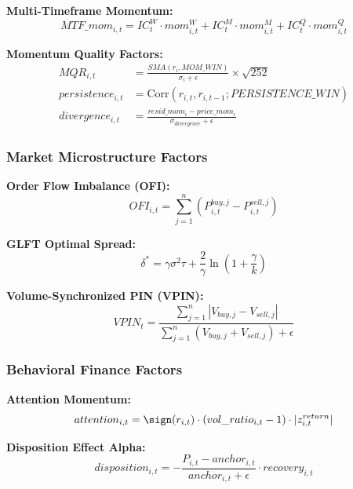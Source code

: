 \documentclass[11pt,letterpaper]{book}
\newcommand{\Corr}{\mathrm{Corr}}
\begin{document}
\textbf{Multi-Timeframe Momentum:}
\begin{equation}
MTF\_mom_{i,t} = IC_t^W \cdot mom_{i,t}^W + IC_t^M \cdot mom_{i,t}^M + IC_t^Q \cdot mom_{i,t}^Q
\end{equation}

\textbf{Momentum Quality Factors:}
\begin{align}
MQR_{i,t} &= \frac{SMA(r_i, MOM\_WIN)}{\sigma_i + \epsilon} \times \sqrt{252} \\
persistence_{i,t} &= \Corr(r_{i,t}, r_{i,t-1}; PERSISTENCE\_WIN) \\
divergence_{i,t} &= \frac{resid\_mom_i - price\_mom_i}{\sigma_{divergence} + \epsilon}
\end{align}

\subsubsection{Market Microstructure Factors}

\textbf{Order Flow Imbalance (OFI):}
\begin{equation}
OFI_{i,t} = \sum_{j=1}^n (P_{i,t}^{buy,j} - P_{i,t}^{sell,j})
\end{equation}

\textbf{GLFT Optimal Spread:}
\begin{equation}
\delta^* = \gamma \sigma^2 \tau + \frac{2}{\gamma} \ln\left(1 + \frac{\gamma}{k}\right)
\end{equation}

\textbf{Volume-Synchronized PIN (VPIN):}
\begin{equation}
VPIN_t = \frac{\sum_{j=1}^n |V_{buy,j} - V_{sell,j}|}{\sum_{j=1}^n (V_{buy,j} + V_{sell,j}) + \epsilon}
\end{equation}

\subsubsection{Behavioral Finance Factors}

\textbf{Attention Momentum:}
\begin{equation}
attention_{i,t} = \sign(r_{i,t}) \cdot (vol\_ratio_{i,t} - 1) \cdot |z_{i,t}^{return}|
\end{equation}

\textbf{Disposition Effect Alpha:}
\begin{equation}
disposition_{i,t} = -\frac{P_{i,t} - anchor_{i,t}}{anchor_{i,t} + \epsilon} \cdot recovery_{i,t}
\end{equation}
\end{document}

